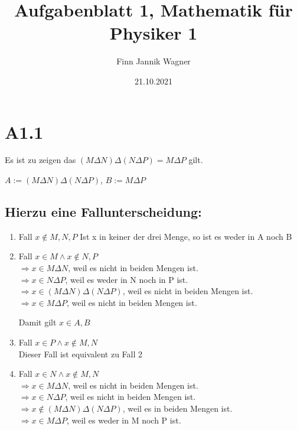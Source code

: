 \documentclass{article}
\date{21.10.2021}
\title{Aufgabenblatt 1, Mathematik für Physiker 1}
\author{Finn Jannik Wagner}
\begin{document}
    \maketitle
    \section{A1.1}
    Es ist zu zeigen das
    \((M \Delta N) \Delta (N\Delta P) = M \Delta P\) gilt.

    \(A := (M \Delta N) \Delta (N\Delta P)\), 
    \(B := M \Delta P\)

    \subsection{Hierzu eine Fallunterscheidung:}
    
    \begin{enumerate}
        \item Fall \( x \notin M, N, P \)
        Ist x in keiner der drei Menge, so ist es weder in A noch B 

        \item Fall \(x \in M \land x \notin N, P\) \\
        \(\Rightarrow x \in M \Delta N \), weil es nicht in beiden Mengen ist. \\
        \(\Rightarrow x \in N \Delta P \), weil es weder in N noch in P ist. \\
        \(\Rightarrow x \in ( M \Delta N )\Delta(N \Delta P ) \), weil es nicht in beiden Mengen ist. \\
        \(\Rightarrow x \in M \Delta P \), weil es nicht in beiden Mengen ist.

        Damit gilt \(x \in A, B \)

        \item Fall \(x \in P \land x \notin M, N\) \\
        Dieser Fall ist equivalent zu Fall 2
        
        \item Fall \(x \in N \land x \notin M, N \) \\
        \(\Rightarrow x \in M \Delta N \), weil es nicht in beiden Mengen ist. \\
        \(\Rightarrow x \in N \Delta P \), weil es nicht in beiden Mengen ist. \\
        \(\Rightarrow x \notin ( M \Delta N )\Delta(N \Delta P ) \), weil es in beiden Mengen ist. \\
        \(\Rightarrow x \in M \Delta P \), weil es weder in M noch P ist.


\end{enumerate}
\end{document}
